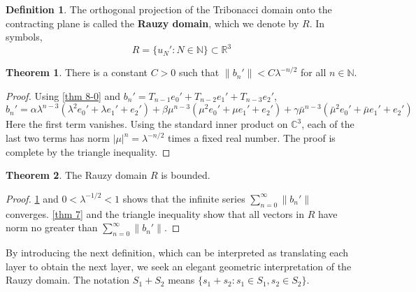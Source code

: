 \documentclass{article}
\theoremstyle{definition}
\newtheorem{theorem}{Theorem}
\newtheorem*{definition}{Definition}
\begin{document}
\begin{definition}
    The orthogonal projection of the Tribonacci domain onto the contracting plane is called the \textbf{Rauzy domain}, which we denote by $R$. In symbols, \[R=\{u_N':N\in \mathbb{N}\}\subset \mathbb{R}^3\]
\end{definition}



\begin{theorem}
    \label{thm 8}
    There is a constant $C>0$ such that $\|b_n' \|<C\lambda^{-n/2}$ for all $n\in \mathbb{N}$.
\end{theorem}
\begin{proof}
Using \cref{thm 8-0} and $b_n'=T_{n-1}e_0'+T_{n-2}e_1'+T_{n-3}e_2'$,
\[
b_n'=\alpha\lambda^{n-3}(\lambda^2e_0'+\lambda e_1'+e_2') + \beta\mu^{n-3}(\mu^2e_0'+\mu e_1'+e_2')+\gamma\bar{\mu}^{n-3}(\bar{\mu}^2e_0'+\bar{\mu} e_1'+e_2')
\]
Here the first term vanishes. Using the standard inner product on $\mathbb{C}^3$, each of the last two terms has norm $|\mu|^{n}=\lambda^{-n/2}$ times a fixed real number. The proof is complete by the triangle inequality.
\end{proof}

\begin{theorem}
\label{thm 9}
    The Rauzy domain $R$ is bounded.
\end{theorem}
\begin{proof}
\cref{thm 8} and $0<\lambda^{-1/2}<1$ shows that the infinite series \(\sum_{n=0}^\infty \|b_n'\| \) converges. \cref{thm 7} and the triangle inequality show that all vectors in $R$ have norm no greater than \(\sum_{n=0}^\infty \|b_n'\| \).
\end{proof}

By introducing the next definition, which can be interpreted as translating each layer to obtain the next layer, we seek an elegant geometric interpretation of the Rauzy domain. The notation $S_1+S_2$ means $\{s_1+s_2:s_1\in S_1,  s_2\in S_2\}$.
\end{document}
